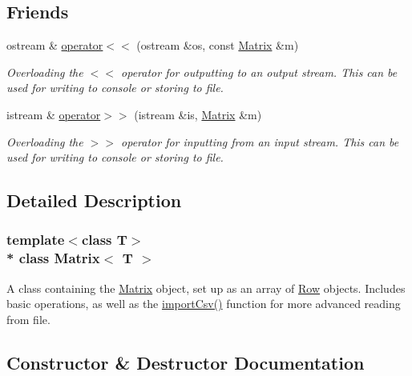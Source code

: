 \subsection*{Friends}
\begin{DoxyCompactItemize}
\item 
ostream \& \hyperlink{class_matrix_a5ed9a90fd6f010e7e9840a17d92d5361}{operator$<$$<$} (ostream \&os, const \hyperlink{class_matrix}{Matrix} \&m)
\begin{DoxyCompactList}\small\item\em Overloading the $<$$<$ operator for outputting to an output stream. This can be used for writing to console or storing to file. \end{DoxyCompactList}\item 
istream \& \hyperlink{class_matrix_afcea9fa7d9a5052070fe1fda963ef237}{operator$>$$>$} (istream \&is, \hyperlink{class_matrix}{Matrix} \&m)
\begin{DoxyCompactList}\small\item\em Overloading the $>$$>$ operator for inputting from an input stream. This can be used for writing to console or storing to file. \end{DoxyCompactList}\end{DoxyCompactItemize}


\subsection{Detailed Description}
\subsubsection*{template$<$class T$>$\\*
class Matrix$<$ T $>$}

A class containing the \hyperlink{class_matrix}{Matrix} object, set up as an array of \hyperlink{class_row}{Row} objects. Includes basic operations, as well as the \hyperlink{class_matrix_aab2f77cfbdbeffcfe67d63d876581b2e}{import\+Csv()} function for more advanced reading from file. 

\subsection{Constructor \& Destructor Documentation}
